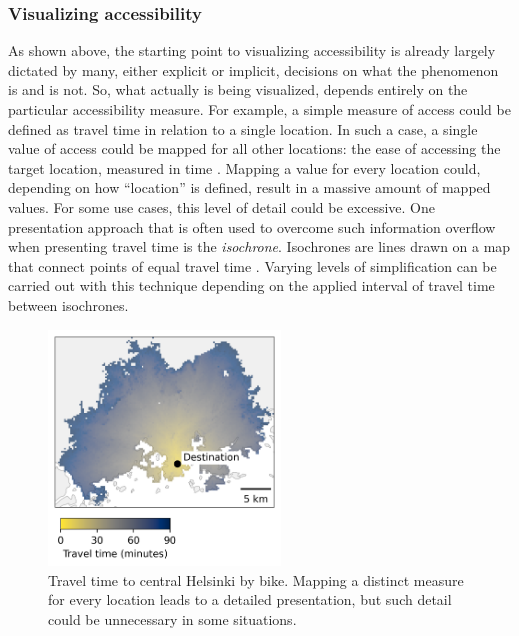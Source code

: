\subsubsection{Visualizing accessibility}

As shown above,
the starting point to visualizing accessibility is already largely dictated by
many, either explicit or implicit, decisions on what the phenomenon is and is not.
So, what actually is being visualized, depends entirely on
the particular accessibility measure.
For example, a simple measure of access could be defined as
travel time in relation to a single location.
In such a case, a single value of access could be mapped
for all other locations:
the ease of accessing the target location, measured in time .
Mapping a value for every location could,
depending on how \enquote{location} is defined,
result in a massive amount of mapped values.
For some use cases, this level of detail could be excessive.
One presentation approach that is often used to overcome
such information overflow when presenting travel time is
the \textit{isochrone}.
Isochrones are lines drawn on a map that
connect points of equal travel time .
Varying levels of simplification can be carried out with this technique
depending on the applied interval of travel time between isochrones.

\begin{figure}[H]
	\centering
	\includegraphics[width=0.55\textwidth]{visual/figures/ttm/tt_surface.png}
	\caption{
		Travel time to central Helsinki by bike.
		Mapping a distinct measure for every location leads to a detailed presentation,
		but such detail could be unnecessary in some situations.
	}
	\label{fig:tt surface}
\end{figure}

